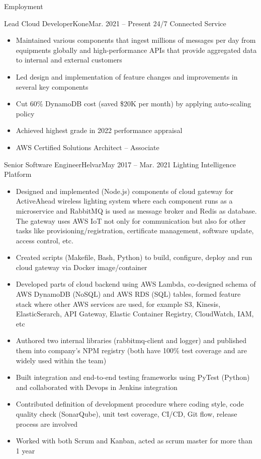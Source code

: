 \documentclass[print]{mcdowellcv}
\begin{document}
	\begin{cvsection}{Employment}
            \begin{cvsubsection}{Lead Cloud Developer}{Kone}{Mar. 2021 -- Present}
                24/7 Connected Service
                \begin{itemize}
                    \item Maintained various components that ingest millions of messages per day from equipments globally and high-performance APIs that provide aggregated data to internal and external customers
                    \item Led design and implementation of feature changes and improvements in several key components
                    \item Cut 60\% DynamoDB cost (saved \$20K per month) by applying auto-scaling policy
                    \item Achieved highest grade in 2022 performance appraisal
                    \item AWS Certified Solutions Architect – Associate
                \end{itemize}
            \end{cvsubsection}
            
		\begin{cvsubsection}{Senior Software Engineer}{Helvar}{May 2017 -- Mar. 2021}
			Lighting Intelligence Platform
			\begin{itemize}
			    \item Designed and implemented (Node.js) components of cloud gateway for ActiveAhead wireless lighting system where each component runs as a microservice and RabbitMQ is used as message broker and Redis as database. The gateway uses AWS IoT not only for communication but also for other tasks like provisioning/registration, certificate management, software update, access control, etc.
				\item Created scripts (Makefile, Bash, Python) to build, configure, deploy and run cloud gateway via Docker image/container
				\item Developed parts of cloud backend using AWS Lambda, co-designed schema of AWS DynamoDB (NoSQL) and AWS RDS (SQL) tables, formed feature stack where other AWS services are used, for example S3, Kinesis, ElasticSerarch, API Gateway, Elastic Container Registry, CloudWatch, IAM, etc
				\item Authored two internal libraries (rabbitmq-client and logger) and published them into company's NPM registry (both have 100\% test coverage and are widely used within the team)
				\item Built integration and end-to-end testing frameworks using PyTest (Python) and collaborated with Devops in Jenkins integration
				\item Contributed definition of development procedure where coding style, code quality check (SonarQube), unit test coverage, CI/CD, Git flow, release process are involved
				\item Worked with both Scrum and Kanban, acted as scrum master for more than 1 year
			\end{itemize}
		\end{cvsubsection}
		

\end{cvsection}
\end{document}
